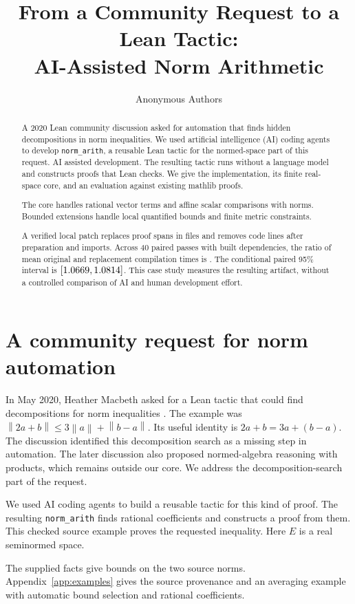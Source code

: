 \documentclass{article}
\title{From a Community Request to a Lean Tactic:\\AI-Assisted Norm Arithmetic}
\author{Anonymous Authors}
\date{}
\newcommand{\norm}[1]{\left\lVert#1\right\rVert}
\newcommand{\NA}{\texttt{norm\_arith}}
\begin{document}
\maketitle
\begin{abstract}
A 2020 Lean community discussion asked for automation that finds hidden decompositions in norm inequalities.
We used artificial intelligence (AI) coding agents to develop \NA{}, a reusable Lean tactic for the normed-space part of this request.
AI assisted development.
The resulting tactic runs without a language model and constructs proofs that Lean checks.
We give the implementation, its finite real-space core, and an evaluation against existing mathlib proofs.

The core handles rational vector terms and affine scalar comparisons with norms.
Bounded extensions handle local quantified bounds and finite metric constraints.

A verified local patch replaces \PatchReplacements{} proof spans in \PatchFiles{} files and removes \PatchNetSaved{} code lines after preparation and imports.
Across 40 paired passes with built dependencies, the ratio of mean original and replacement compilation times is \StudyRatio{}.
The conditional paired 95\% interval is $[1.0669{},1.0814{}]$.
This case study measures the resulting artifact, without a controlled comparison of AI and human development effort.
\end{abstract}

\section{A community request for norm automation}
\label{sec:problem}
In May 2020, Heather Macbeth asked for a Lean tactic that could find decompositions for norm inequalities \citep{leanrequest2020}.
The example was $\norm{2a+b}\le3\norm{a}+\norm{b-a}$.
Its useful identity is $2a+b=3a+(b-a)$.
The discussion identified this decomposition search as a missing step in automation.
The later discussion also proposed normed-algebra reasoning with products, which remains outside our core.
We address the decomposition-search part of the request.

We used AI coding agents to build a reusable tactic for this kind of proof.
The resulting \NA{} finds rational coefficients and constructs a proof from them.
This checked source example proves the requested inequality.
Here $E$ is a real seminormed space.


The supplied facts give bounds on the two source norms.
Appendix~\ref{app:examples} gives the source provenance and an averaging example with automatic bound selection and rational coefficients.
\end{document}
